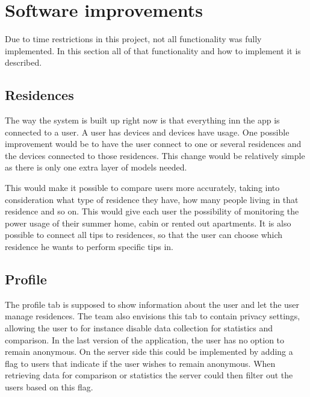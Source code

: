 \section{Software improvements}
Due to time restrictions in this project, not all functionality was fully implemented. In this section all of that functionality and how to implement it is described. 

\subsection{Residences}
The way the system is built up right now is that everything inn the app is connected to a user. A user has devices and devices have usage. One possible improvement would be to have the user connect to one or several residences and the devices connected to those residences. This change would be relatively simple as there is only one extra layer of models needed.

This would make it possible to compare users more accurately, taking into consideration what type of residence they have, how many people living in that residence and so on. This would give each user the possibility of monitoring the power usage of their summer home, cabin or rented out apartments. It is also possible to connect all tips to residences, so that the user can choose which residence he wants to perform specific tips in. 

\subsection{Profile}

The profile tab is supposed to show information about the user and let the user manage residences. The team also envisions this tab to contain privacy settings, allowing the user to for instance disable data collection for statistics and comparison. In the last version of the application, the user has no option to remain anonymous. 
On the server side this could be implemented by adding a flag to users that indicate if the user wishes to remain anonymous. When retrieving data for comparison or statistics the server could then filter out the users based on this flag.